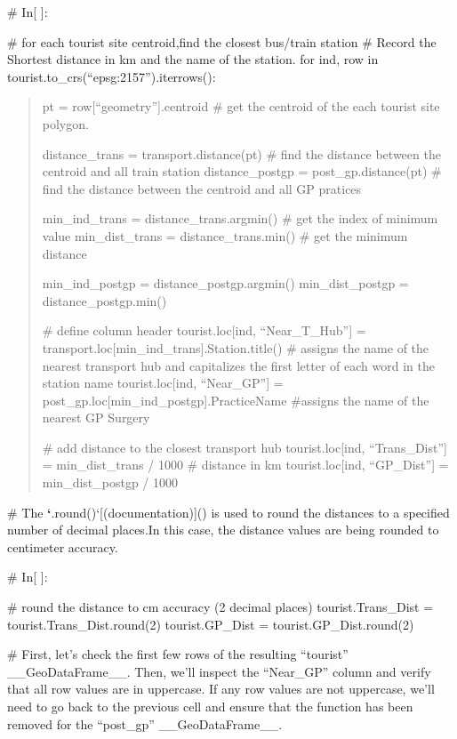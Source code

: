 \documentclass[letterpaper,10pt,english]{sphinxmanual}
\begin{document}
\sphinxAtStartPar
\# In{[} {]}:

\sphinxAtStartPar
\# for each tourist site centroid,find the closest bus/train station
\# Record the Shortest distance in km and the name of the station.
for ind, row in tourist.to\_crs(“epsg:2157”).iterrows():
\begin{quote}

\sphinxAtStartPar
pt = row{[}“geometry”{]}.centroid \# get the centroid of the each tourist site polygon.

\sphinxAtStartPar
distance\_trans = transport.distance(pt) \# find the distance between the centroid and all train station
distance\_postgp = post\_gp.distance(pt) \# find the distance between the centroid and all GP pratices

\sphinxAtStartPar
min\_ind\_trans = distance\_trans.argmin() \# get the index of minimum value
min\_dist\_trans = distance\_trans.min() \# get the minimum distance

\sphinxAtStartPar
min\_ind\_postgp = distance\_postgp.argmin()
min\_dist\_postgp = distance\_postgp.min()

\sphinxAtStartPar
\# define column header
tourist.loc{[}ind, “Near\_T\_Hub”{]} = transport.loc{[}min\_ind\_trans{]}.Station.title() \# assigns the name of the nearest transport hub and capitalizes the first letter of each word in the station name
tourist.loc{[}ind, “Near\_GP”{]} = post\_gp.loc{[}min\_ind\_postgp{]}.PracticeName \#assigns the name of the nearest GP Surgery

\sphinxAtStartPar
\# add distance to the closest transport hub
tourist.loc{[}ind, “Trans\_Dist”{]} = min\_dist\_trans / 1000 \# distance in km
tourist.loc{[}ind, “GP\_Dist”{]} = min\_dist\_postgp / 1000
\end{quote}

\sphinxAtStartPar
\# The {\color{red}\bfseries{}`}.round()`{[}(documentation){]}()  is used to round the distances to a specified number of decimal places.In this case, the distance values are being rounded to centimeter accuracy.

\sphinxAtStartPar
\# In{[} {]}:

\sphinxAtStartPar
\# round the distance to cm accuracy (2 decimal places)
tourist.Trans\_Dist = tourist.Trans\_Dist.round(2)
tourist.GP\_Dist = tourist.GP\_Dist.round(2)

\sphinxAtStartPar
\# First, let’s check the first few rows of the resulting “tourist” \_\_GeoDataFrame\_\_. Then, we’ll inspect the “Near\_GP” column and verify that all row values are in uppercase. If any row values are not uppercase, we’ll need to go back to the previous cell and ensure that the  function has been removed for the “post\_gp” \_\_GeoDataFrame\_\_.
\end{document}
